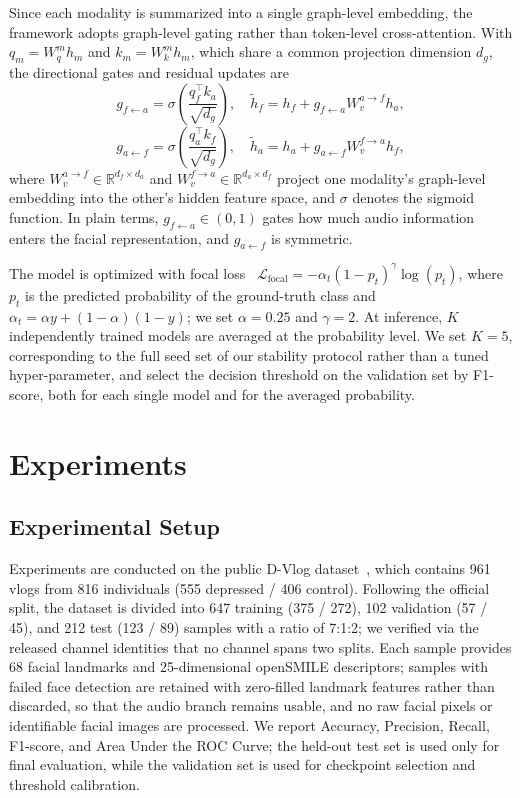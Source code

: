 \documentclass[conference]{IEEEtran}
\begin{document}
Since each modality is summarized into a single graph-level embedding, the framework adopts graph-level gating rather than token-level cross-attention. With \(q_m = W^m_q h_m\) and \(k_m = W^m_k h_m\), which share a common projection dimension \(d_g\), the directional gates and residual updates are
\begin{equation}
g_{f \leftarrow a}
=
\sigma\left(\frac{q_f^\top k_a}{\sqrt{d_g}}\right),
\quad
\tilde{h}_f
=
h_f + g_{f \leftarrow a} W^{a \rightarrow f}_v h_a,
\end{equation}
\begin{equation}
g_{a \leftarrow f}
=
\sigma\left(\frac{q_a^\top k_f}{\sqrt{d_g}}\right),
\quad
\tilde{h}_a
=
h_a + g_{a \leftarrow f} W^{f \rightarrow a}_v h_f ,
\end{equation}
where \(W^{a \rightarrow f}_v \in \mathbb{R}^{d_f \times d_a}\) and \(W^{f \rightarrow a}_v \in \mathbb{R}^{d_a \times d_f}\) project one modality's graph-level embedding into the other's hidden feature space, and \(\sigma\) denotes the sigmoid function. In plain terms, \(g_{f \leftarrow a} \in (0,1)\) gates how much audio information enters the facial representation, and \(g_{a \leftarrow f}\) is symmetric.

The model is optimized with focal loss~\cite{lin2017focal} \(\mathcal{L}_{\mathrm{focal}} = -\alpha_t(1-p_t)^\gamma \log(p_t)\), where \(p_t\) is the predicted probability of the ground-truth class and \(\alpha_t = \alpha y + (1-\alpha)(1-y)\); we set \(\alpha=0.25\) and \(\gamma=2\). At inference, \(K\) independently trained models are averaged at the probability level. We set \(K=5\), corresponding to the full seed set of our stability protocol rather than a tuned hyper-parameter, and select the decision threshold on the validation set by F1-score, both for each single model and for the averaged probability.

\section{Experiments}
\label{sec:experiments}

\subsection{Experimental Setup}
\label{sec:setup}

Experiments are conducted on the public D-Vlog dataset~\cite{yoon2022dvlog}, which contains 961 vlogs from 816 individuals (555 depressed / 406 control). Following the official split, the dataset is divided into 647 training (375 / 272), 102 validation (57 / 45), and 212 test (123 / 89) samples with a ratio of 7:1:2; we verified via the released channel identities that no channel spans two splits. Each sample provides 68 facial landmarks and 25-dimensional openSMILE descriptors; samples with failed face detection are retained with zero-filled landmark features rather than discarded, so that the audio branch remains usable, and no raw facial pixels or identifiable facial images are processed. We report Accuracy, Precision, Recall, F1-score, and Area Under the ROC Curve; the held-out test set is used only for final evaluation, while the validation set is used for checkpoint selection and threshold calibration.
\end{document}
